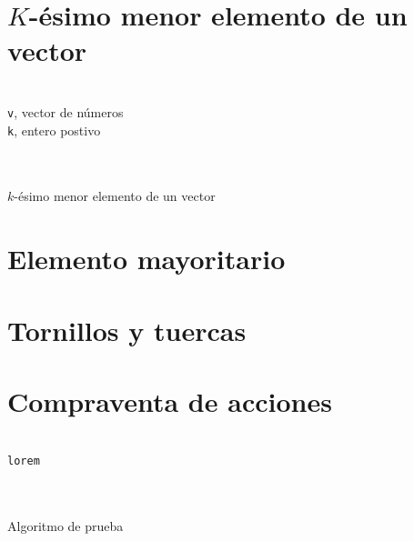 \documentclass[a4paper, 11pt]{article} %
\begin{document}
\section {$K$-ésimo menor elemento de un vector}
\begin{algorithm}[H]
	\begin{algorithmic}[1]
		\REQUIRE \ \\
        	\texttt{v}, vector de números\\
        	\texttt{k}, entero postivo\\\
	\\\
	  \RETURN {pivote}
	\ELSE
	\ENDIF
	\end{algorithmic}
    \caption{$k$-ésimo menor elemento de un vector}
    \label{kesimo}
\end{algorithm}

\section {Elemento mayoritario}
\section {Tornillos y tuercas}
\section {Compraventa de acciones}

\begin{algorithm}[H]
	\begin{algorithmic}[1]
		\REQUIRE \ \\
        	\texttt{lorem}\\\
    	\ENDIF \\\
	\end{algorithmic}
    \caption{Algoritmo de prueba}
    \label{algoritmo}
\end{algorithm}
\end{document}
